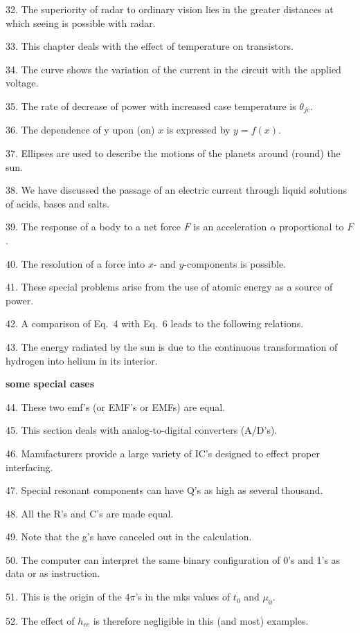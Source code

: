 \documentclass[a4paper,twocolumn,10pt]{article}
\begin{document}
\begin{CJK}{UTF8}{gkai}
	32. The superiority of radar to ordinary vision lies in the greater distances at which seeing
	is possible with radar.

	33. This chapter deals with the effect of temperature on transistors.

	34. The curve shows the variation of the current in the circuit with the applied voltage.

	35. The rate of decrease of power with increased case temperature is $\theta_{jc}$.

	36. The dependence of y upon (on) $x$ is expressed by $y = f(x)$.

	37. Ellipses are used to describe the motions of the planets around (round) the sun.

	38. We have discussed the passage of an electric current through liquid solutions of acids, bases and salts.

	39. The response of a body to a net force $F$ is an acceleration $\alpha$ proportional to $F$.

	40. The resolution of a force into $x$- and $y$-components is possible.

	41. These special problems arise from the use of atomic energy as a source of power.

	42. A comparison of Eq.~4 with Eq.~6 leads to the following relations.

	43. The energy radiated by the sun is due to the continuous transformation of hydrogen into
	helium in its interior.

	{\bf some special cases}

	44. These two emf's (or EMF's or EMFs) are equal.

	45. This section deals with analog-to-digital converters (A/D's).

	46. Manufacturers provide a large variety of IC's designed to effect proper interfacing.

	47. Special resonant components can have Q's as high as several thousand.

	48. All the R's and C's are made equal.

	49. Note that the g's have canceled out in the calculation.

	50. The computer can interpret the same binary configuration of 0's and 1's
	as data or as instruction.

	51. This is the origin of the $4\pi$'s in the mks values of $t_0$ and $\mu_0$.

	52. The effect of $h_{re}$ is therefore negligible in this (and most) examples.


\end{CJK}
\end{document}
